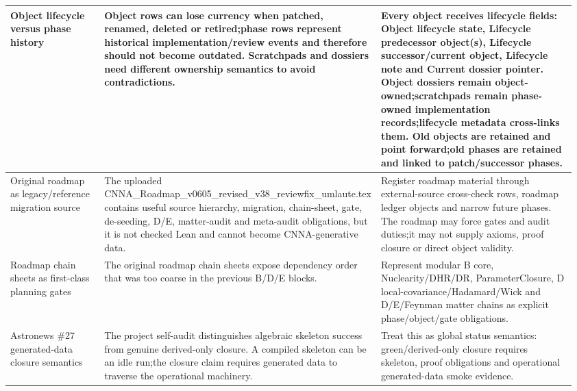 \begin{longtable}{L{0.18\linewidth} L{0.38\linewidth} L{0.4\linewidth}}
\hline
\addlinespace[0.24em]
Object lifecycle versus phase history & Object rows can lose currency when patched, renamed, deleted or retired;\newline phase rows represent historical implementation/\allowbreak{}review events and therefore should not become outdated. Scratchpads and dossiers need different ownership semantics to avoid contradictions. & Every object receives lifecycle fields: Object lifecycle state, Lifecycle predecessor object(s), Lifecycle successor/\allowbreak{}current object, Lifecycle note and Current dossier pointer. Object dossiers remain object-owned;\newline scratchpads remain phase-owned implementation records;\newline lifecycle metadata cross-links them. Old objects are retained and point forward;\newline old phases are retained and linked to patch/\allowbreak{}successor phases.\\
\hline
\addlinespace[0.24em]
Original roadmap as legacy/\allowbreak{}reference migration source & The uploaded CNNA\_Roadmap\_v0605\_revised\_v38\_reviewfix\_umlaute.tex contains useful source hierarchy, migration, chain-sheet, gate, de-seeding, D/\allowbreak{}E, matter-audit and meta-audit obligations, but it is not checked Lean and cannot become CNNA-generative data. & Register roadmap material through external-source cross-check rows, roadmap ledger objects and narrow future phases. The roadmap may force gates and audit duties;\newline it may not supply axioms, proof closure or direct object validity.\\
\hline
\addlinespace[0.24em]
Roadmap chain sheets as first-class planning gates & The original roadmap chain sheets expose dependency order that was too coarse in the previous B/\allowbreak{}D/\allowbreak{}E blocks. & Represent modular B core, Nuclearity/\allowbreak{}DHR/\allowbreak{}DR, ParameterClosure, D local-covariance/\allowbreak{}Hadamard/\allowbreak{}Wick and D/\allowbreak{}E/\allowbreak{}Feynman matter chains as explicit phase/\allowbreak{}object/\allowbreak{}gate obligations.\\
\hline
\addlinespace[0.24em]
Astronews \#27 generated-data closure semantics & The project self-audit distinguishes algebraic skeleton success from genuine derived-only closure. A compiled skeleton can be an idle run;\newline the closure claim requires generated data to traverse the operational machinery. & Treat this as global status semantics: green/\allowbreak{}derived-only closure requires skeleton, proof obligations and operational generated-data smoke evidence.\\

\end{longtable}
